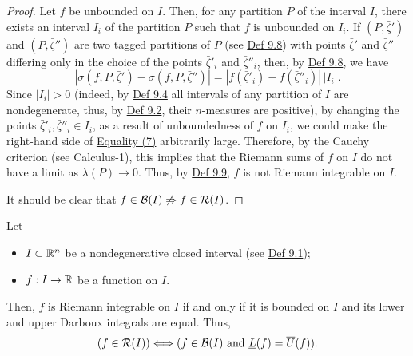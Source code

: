 \begin{proof}
Let $f$ be unbounded on $I$. Then, for any partition $P$ of the interval $I$, there exists an interval $I_i$ of the partition $P$ such that $f$ is unbounded on $I_i$.
If $(P,\bar\zeta')$ and $(P,\bar\zeta'')$ are two tagged partitions of $P$ (see \hyperref[def:9.8]{Def 9.8}) with points $\bar\zeta'$ and $\bar\zeta''$ differing only in the choice of the points $\bar\zeta'_i$ and $\bar\zeta''_i$, then, by \hyperref[def:9.8]{Def 9.8}, we have
\[
|\sigma(f,P,\bar\zeta')-\sigma(f,P,\bar\zeta'')|
=|f(\bar\zeta'_i)-f(\bar\zeta''_i)|\,|I_i|.
\tag{7}\label{eq:9:7:1}
\]
Since $|I_i|>0$ (indeed, by \hyperref[def:9.4]{Def 9.4} all intervals of any partition of $I$ are nondegenerate, thus, by \hyperref[def:9.2]{Def 9.2}, their $n$-measures are positive), by changing the points $\bar\zeta'_i,\bar\zeta''_i\in I_i$, as a result of unboundedness of $f$ on $I_i$, we could make the right-hand side of \hyperref[eq:9:7:1]{Equality (7)} arbitrarily large.
Therefore, by the Cauchy criterion (see Calculus-1), this implies that the Riemann sums of $f$ on $I$ do not have a limit as $\lambda(P)\to0$.
Thus, by \hyperref[def:9.9]{Def 9.9}, $f$ is not Riemann integrable on $I$.

It should be clear that $f\in\mathcal{B}(I)\not\Rightarrow f\in\mathcal{R}(I)$.
\end{proof}

\begin{claim}\label{claim:9.6}
Let
\begin{itemize}
    \item $I\subset\mathbb{R}^n$ be a nondegenerative closed interval (see \hyperref[def:9.1]{Def 9.1});
    \item $f:I\to\mathbb{R}$ be a function on $I$.
\end{itemize}
Then, $f$ is Riemann integrable on $I$ if and only if it is bounded on $I$ and its lower and upper Darboux integrals are equal.
Thus,
\[
(f\in\mathcal{R}(I))\Longleftrightarrow(f\in\mathcal{B}(I)\text{ and }\underline{L}(f)=\overline{U}(f)).
\]
\end{claim}

